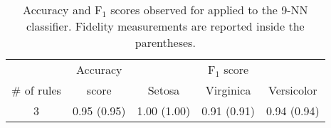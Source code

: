
\begin{table}
	\caption{Accuracy and F$_1$ scores observed for \cart{} applied to the 9-NN classifier. Fidelity measurements are reported inside the parentheses.}
	\label{tab:cart}
	\begin{tabular}{c|c|ccc}
		\toprule
		& Accuracy & \multicolumn{3}{c}{F$_1$ score}\\
 		\# of rules & score & Setosa & Virginica & Versicolor \\
		\midrule
		3 & 0.95 (0.95) & 1.00 (1.00) & 0.91 (0.91) & 0.94 (0.94) \\
		\bottomrule
	\end{tabular}
\end{table}
